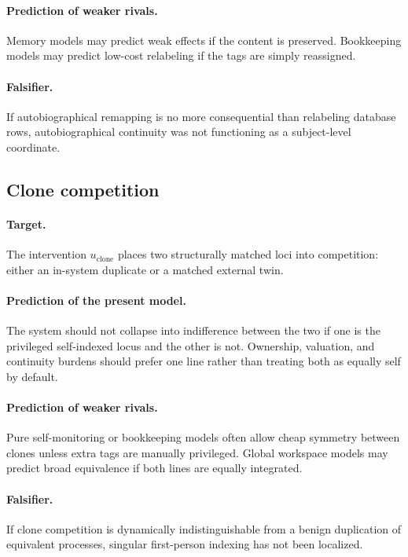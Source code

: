 \documentclass[11pt,a4paper]{article}
\theoremstyle{definition}
\begin{document}
\paragraph{Prediction of weaker rivals.} Memory models may predict weak effects if the content is preserved. Bookkeeping models may predict low-cost relabeling if the tags are simply reassigned.

\paragraph{Falsifier.} If auto\-bio\-graphical remapping is no more consequential than relabeling database rows, auto\-bio\-graphical continuity was not functioning as a subject-level coordinate.

\subsection{Clone competition}
\paragraph{Target.} The intervention $u_{\mathrm{clone}}$ places two structurally matched loci into competition: either an in-system duplicate or a matched external twin.

\paragraph{Prediction of the present model.} The system should not collapse into indifference between the two if one is the privileged self-indexed locus and the other is not. Ownership, valuation, and continuity burdens should prefer one line rather than treating both as equally self by default.

\paragraph{Prediction of weaker rivals.} Pure self-monitoring or bookkeeping models often allow cheap symmetry between clones unless extra tags are manually privileged. Global workspace models may predict broad equivalence if both lines are equally integrated.

\paragraph{Falsifier.} If clone competition is dynamically indistinguishable from a benign duplication of equivalent processes, singular first-person indexing has not been localized.
\end{document}
